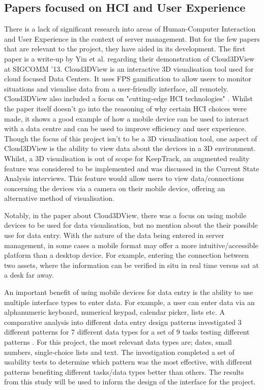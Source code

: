 \documentclass [11pt,a4paper]{article}
\begin{document}
\subsection{Papers focused on HCI and User Experience}
\label{sec:HCI}
There is a lack of significant research into areas of Human-Computer Interaction and User Experience in the context of server management. But for the few papers that are relevant to the project, they have aided in its development. The first paper is a write-up by Yin et al. \cite{cloud3dview} regarding their demonstration of Cloud3DView at SIGCOMM '13. Cloud3DView is an interactive 3D visualisation tool used for cloud focused Data Centers. It uses FPS gamification to allow users to monitor situations and visualise data from a user-friendly interface, all remotely. Cloud3DView also included a focus on "cutting-edge HCI technologies" \cite{cloud3dview}. Whilst the paper itself doesn't go into the reasoning of why certain HCI choices were made, it shows a good example of how a mobile device can be used to interact with a data centre and can be used to improve efficiency and user experience. Though the focus of this project isn't to be a 3D visualisation tool, one aspect of Cloud3DView is the ability to view data about the devices in a 3D environment. Whilst, a 3D visualisation is out of scope for KeepTrack, an augmented reality feature was considered to be implemented and was discussed in the Current State Analysis interviews. This feature would allow users to view data/connections concerning the devices via a camera on their mobile device, offering an alternative method of visualisation.

Notably, in the paper about Cloud3DView, there was a focus on using mobile devices to be used for data visualisation, but no mention about the their possible use for data entry. With the nature of the data being entered in server management, in some cases a mobile format may offer a more intuitive/accessible platform than a desktop device. For example, entering the connection between two assets, where the information can be verified in situ in real time versus sat at a desk far away.

An important benefit of using mobile devices for data entry is the ability to use multiple interface types to enter data. For example, a user can enter data via an alphanumeric keyboard, numerical keypad, calendar picker, lists etc. A comparative analysis into different data entry design patterns investigated 3 different patterns for 7 different data types for a set of 9 tasks testing different patterns \cite{myka2019comparative}. For this project, the most relevant data types are; dates, small numbers, single-choice lists and text. The investigation completed a set of usability tests to determine which pattern was the most effective, with different patterns benefiting different tasks/data types better than others. The results from this study will be used to inform the design of the interface for the project.
\end{document}
